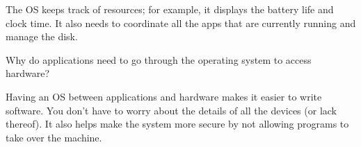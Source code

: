 \begin{answer}
The OS keeps track of resources; for example, it displays the battery life and clock time.
It also needs to coordinate all the apps that are currently running and manage the disk.
\end{answer}


\Q Why do applications need to go through the operating system to access hardware?

\begin{answer}
Having an OS between applications and hardware makes it easier to write software.
You don't have to worry about the details of all the devices (or lack thereof).
It also helps make the system more secure by not allowing programs to take over the machine.
\end{answer}
